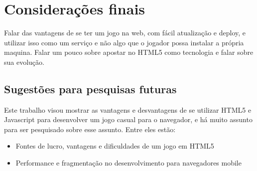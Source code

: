 \section{Considerações finais}

Falar das vantagens de se ter um jogo na web, com fácil atualização e
deploy, e utilizar isso como um serviço e não algo que o jogador possa
instalar a própria maquina.
Falar um pouco sobre apostar no HTML5 como tecnologia e falar sobre
sua evolução.

\subsection{Sugestões para pesquisas futuras}

Este trabalho visou mostrar as vantagens e desvantagens de se utilizar
HTML5 e Javascript para desenvolver um jogo casual para o navegador,
e há muito assunto para ser pesquisado sobre esse assunto. Entre eles
estão:

\begin{itemize}
    \item Fontes de lucro, vantagens e dificuldades de um jogo em HTML5
    \item Performance e fragmentação no desenvolvimento para navegadores mobile
\end{itemize}
